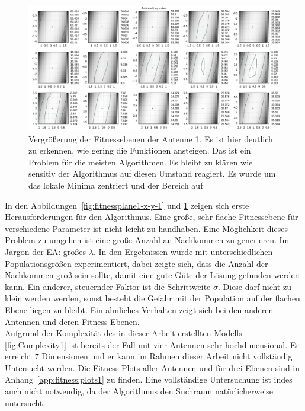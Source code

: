 \begin{figure}[ht!]
  \caption[Fitness Ebenen Heatmap, vergrößert]{Vergrößerung der Fitnessebenen der Antenne 1. Es ist hier deutlich zu erkennen, wie gering die Funktionen ansteigen. Das ist ein Problem für die meisten Algorithmen. Es bleibt zu klären wie sensitiv der Algorithmus auf diesen Umstand reagiert. Es wurde um das lokale Minima zentriert und der Bereich auf}
  \begin{center}
   \includegraphics[width=\textwidth]{img/fitness/xy_a0zoomed.png}
  \end{center}
  \label{fig:fitnessplane1-x-y-zoom-1}
%
\end{figure}
%
In den Abbildungen~\ref{fig:fitnessplane1-x-y-1} und \ref{fig:fitnessplane1-x-y-zoom-1} zeigen sich erste Herausforderungen für den Algorithmus. Eine große, sehr flache Fitnessebene für verschiedene Parameter ist nicht leicht zu handhaben. Eine Möglichkeit dieses Problem zu umgehen ist eine große Anzahl an Nachkommen zu generieren. Im Jargon der EA: großes $\lambda$. In den Ergebnissen wurde mit unterschiedlichen Populationsgrößen experimentiert, dabei zeigte sich, dass die Anzahl der Nachkommen groß sein sollte, damit eine gute Güte der Lösung gefunden werden kann. Ein anderer, steuernder Faktor ist die Schrittweite $\sigma$. Diese darf nicht zu klein werden werden, sonst besteht die Gefahr mit der Population auf der flachen Ebene liegen zu bleibt. Ein ähnliches Verhalten zeigt sich bei den anderen Antennen und deren Fitness-Ebenen.\\
Aufgrund der Komplexität des in dieser Arbeit erstellten Modells \ref{fig:Complexity1} ist bereits der Fall mit vier Antennen sehr hochdimensional. Er erreicht $7$ Dimensionen und er kann im Rahmen dieser Arbeit nicht vollständig Untersucht werden. Die Fitness-Plots aller Antennen und für drei Ebenen sind in Anhang~\ref{app:fitness:plots1} zu finden. Eine vollständige Untersuchung ist indes auch nicht notwendig, da der Algorithmus den Suchraum natürlicherweise untersucht. 
